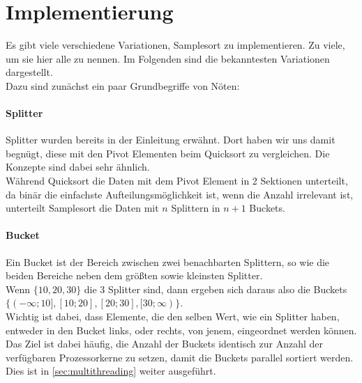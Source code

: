 \section{Implementierung}
	Es gibt viele verschiedene Variationen, Samplesort zu implementieren. Zu viele, um sie hier alle zu nennen.
	Im Folgenden sind die bekanntesten Variationen dargestellt.\\
	Dazu sind zunächst ein paar Grundbegriffe von Nöten:
	\paragraph{Splitter}
		Splitter wurden bereits in der Einleitung erwähnt.
		Dort haben wir uns damit begnügt, diese mit den Pivot Elementen beim Quicksort zu vergleichen.
		Die Konzepte sind dabei sehr ähnlich.\\
		Während Quicksort die Daten mit dem Pivot Element in 2 Sektionen unterteilt, da binär die einfachste Aufteilungsmöglichkeit ist, wenn die Anzahl irrelevant ist, unterteilt Samplesort die Daten mit $n$ Splittern in $n+1$ Buckets.
	\paragraph{Bucket}
		Ein Bucket ist der Bereich zwischen zwei benachbarten Splittern, so wie die beiden Bereiche neben dem größten sowie kleinsten Splitter.\\
		Wenn $\{10, 20, 30\}$ die 3 Splitter sind, dann ergeben sich daraus also die Buckets $\{(-\infty;10],\allowbreak [10;20],\allowbreak [20;30],\allowbreak [30;\infty)\}$.\\
		Wichtig ist dabei, dass Elemente, die den selben Wert, wie ein Splitter haben, entweder in den Bucket links, oder rechts, von jenem, eingeordnet werden können.\\
		Das Ziel ist dabei häufig, die Anzahl der Buckets identisch zur Anzahl der verfügbaren Prozessorkerne zu setzen, damit die Buckets parallel sortiert werden. Dies ist in \ref{sec:multithreading} weiter ausgeführt.

